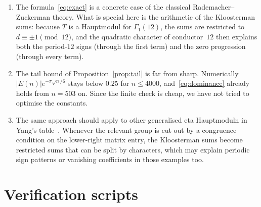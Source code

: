 \documentclass[11pt]{amsart}
\numberwithin{equation}{section}
\theoremstyle{definition}
\theoremstyle{remark}
\begin{document}
\begin{enumerate}[label=\arabic*.,leftmargin=*]
\item The formula~\eqref{eq:exact} is a concrete case of the classical Rademacher--Zuckerman theory. What is special here is the arithmetic of the Kloosterman sums: because $T$ is a Hauptmodul for $\Gamma_1(12)$, the sums are restricted to $d\equiv\pm1\pmod{12}$, and the quadratic character of conductor~$12$ then explains both the period-$12$ signs (through the first term) and the zero progression (through every term).
\item The tail bound of Proposition~\ref{prop:tail} is far from sharp. Numerically $|E(n)|e^{-\pi\sqrt n/6}$ stays below $0.25$ for $n\le4000$, and~\eqref{eq:dominance} already holds from $n=503$ on. Since the finite check is cheap, we have not tried to optimise the constants.
\item The same approach should apply to other generalised eta Hauptmoduln in Yang's table~\cite{Yang}. Whenever the relevant group is cut out by a congruence condition on the lower-right matrix entry, the Kloosterman sums become restricted sums that can be split by characters, which may explain periodic sign patterns or vanishing coefficients in those examples too.
\end{enumerate}

\appendix
\section{Verification scripts}\label{app:code}
\end{document}
